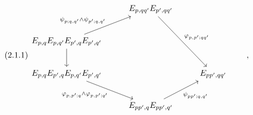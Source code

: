 \begin{equation}\tag{2.1.1}
\begin{tikzcd}[column sep=1.2em, row sep=2.2em]
 & & E_{p,qq'}E_{p',qq'} \arrow[rrdd, "{\varphi_{p,p';qq'}}"] & & \\
E_{p,q}E_{p,q'}E_{p',q}E_{p',q'} \arrow[rru, "{\psi_{p;q,q'}\wedge\psi_{p';q,q'}}"] \arrow[d] & & & & \\
E_{p,q}E_{p',q}E_{p,q'}E_{p',q'} \arrow[rrd, "{\varphi_{p,p';q}\wedge\varphi_{p,p';q'}}"'] & & & & E_{pp',qq'} \\
 & & E_{pp',q}E_{pp',q'} \arrow[rru, "{\psi_{pp';q,q'}}"'] & &
\end{tikzcd}
\qquad ,
\end{equation}
